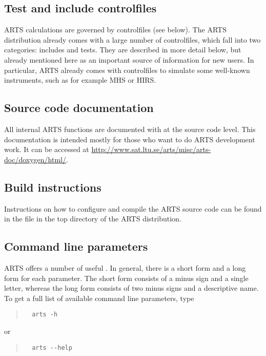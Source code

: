 \subsection{Test and include controlfiles}

ARTS calculations are governed by controlfiles (see below).  The ARTS
distribution already comes with a large number of controlfiles, which
fall into two categories: includes and tests.  They are described in
more detail below, but already mentioned here as an important source
of information for new users.  In particular, ARTS already comes with
controlfiles to simulate some well-known instruments, such as for
example MHS or HIRS.

\subsection{Source code documentation}

All internal ARTS functions are documented with  at the source
code level.  This documentation is intended mostly for those who want
to do ARTS development work.  It can be accessed at
\url{http://www.sat.ltu.se/arts/misc/arts-doc/doxygen/html/}. 

\subsection{Build instructions}

Instructions on how to configure and compile the ARTS source code can
be found in the file  in the top directory of the
ARTS distribution.

\subsection{Command line parameters}

ARTS offers a number of useful . In
general, there is a short form and a long form for each parameter. The
short form consists of a minus sign and a single letter, whereas the
long form consists of two minus signs and a descriptive name. To get a
full list of available command line parameters, type
\begin{quote}
\begin{verbatim}
  arts -h
\end{verbatim}
\end{quote}
or
\begin{quote}
\begin{verbatim}
  arts --help
\end{verbatim}
\end{quote}

